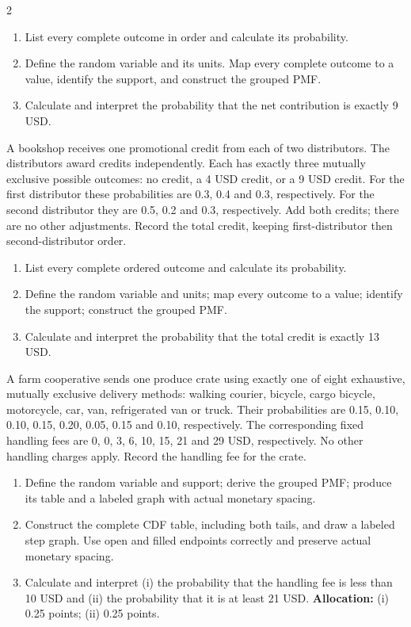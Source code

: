 \begin{multicols*}{2}
\begin{enumerate}[label=(\alph*)]
\item List every complete outcome in order and calculate its probability. 
\item Define the random variable and its units. Map every complete outcome to a value, identify the support, and construct the grouped PMF. 
\item Calculate and interpret the probability that the net contribution is exactly 9 USD. 
\end{enumerate}
\columnbreak
{}
A bookshop receives one promotional credit from each of two distributors. The distributors award credits independently. Each has exactly three mutually exclusive possible outcomes: no credit, a 4 USD credit, or a 9 USD credit. For the first distributor these probabilities are 0.3, 0.4 and 0.3, respectively. For the second distributor they are 0.5, 0.2 and 0.3, respectively. Add both credits; there are no other adjustments. Record the total credit, keeping first-distributor then second-distributor order.

\begin{enumerate}[label=(\alph*)]
\item List every complete ordered outcome and calculate its probability. 
\item Define the random variable and units; map every outcome to a value; identify the support; construct the grouped PMF. 
\item Calculate and interpret the probability that the total credit is exactly 13 USD. 
\end{enumerate}
\columnbreak
{}
A farm cooperative sends one produce crate using exactly one of eight exhaustive, mutually exclusive delivery methods: walking courier, bicycle, cargo bicycle, motorcycle, car, van, refrigerated van or truck. Their probabilities are 0.15, 0.10, 0.10, 0.15, 0.20, 0.05, 0.15 and 0.10, respectively. The corresponding fixed handling fees are 0, 0, 3, 6, 10, 15, 21 and 29 USD, respectively. No other handling charges apply. Record the handling fee for the crate.

\begin{enumerate}[label=(\alph*)]
\item Define the random variable and support; derive the grouped PMF; produce its table and a labeled graph with actual monetary spacing. 
\item Construct the complete CDF table, including both tails, and draw a labeled step graph. Use open and filled endpoints correctly and preserve actual monetary spacing. 
\item Calculate and interpret (i) the probability that the handling fee is less than 10 USD and (ii) the probability that it is at least 21 USD. 
\textbf{Allocation:} (i) 0.25 points; (ii) 0.25 points.
\end{enumerate}


\end{multicols*}
